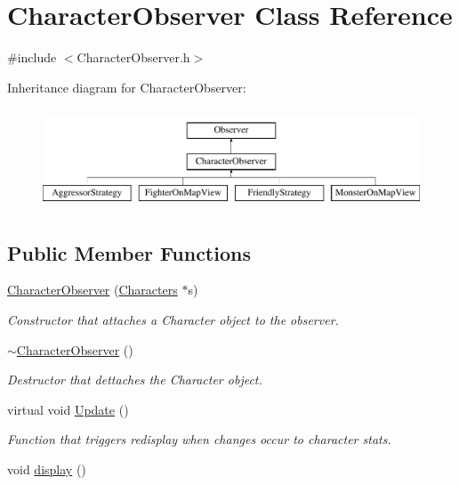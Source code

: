 \hypertarget{class_character_observer}{}\section{Character\+Observer Class Reference}
\label{class_character_observer}


{\ttfamily \#include $<$Character\+Observer.\+h$>$}

Inheritance diagram for Character\+Observer\+:\begin{figure}[H]
\begin{center}
\leavevmode
\includegraphics[height=3.000000cm]{class_character_observer}
\end{center}
\end{figure}
\subsection*{Public Member Functions}
\begin{DoxyCompactItemize}
\item 
\hypertarget{class_character_observer_a787323c17867c2362ebf1b00f6d20a58}{}\label{class_character_observer_a787323c17867c2362ebf1b00f6d20a58} 
\hyperlink{class_character_observer_a787323c17867c2362ebf1b00f6d20a58}{Character\+Observer} (\hyperlink{class_characters}{Characters} $\ast$s)
\begin{DoxyCompactList}\small\item\em Constructor that attaches a Character object to the observer. \end{DoxyCompactList}\item 
\hypertarget{class_character_observer_ac535a0d01c7ab57f41b933a9507116fb}{}\label{class_character_observer_ac535a0d01c7ab57f41b933a9507116fb} 
\hyperlink{class_character_observer_ac535a0d01c7ab57f41b933a9507116fb}{$\sim$\+Character\+Observer} ()
\begin{DoxyCompactList}\small\item\em Destructor that dettaches the Character object. \end{DoxyCompactList}\item 
\hypertarget{class_character_observer_a398d6d784065c7ed36c928d44a574630}{}\label{class_character_observer_a398d6d784065c7ed36c928d44a574630} 
virtual void \hyperlink{class_character_observer_a398d6d784065c7ed36c928d44a574630}{Update} ()
\begin{DoxyCompactList}\small\item\em Function that triggers redisplay when changes occur to character stats. \end{DoxyCompactList}\item 
void \hyperlink{class_character_observer_af255a3fd431b55de8dd2ab9a639e546b}{display} ()
\end{DoxyCompactItemize}
